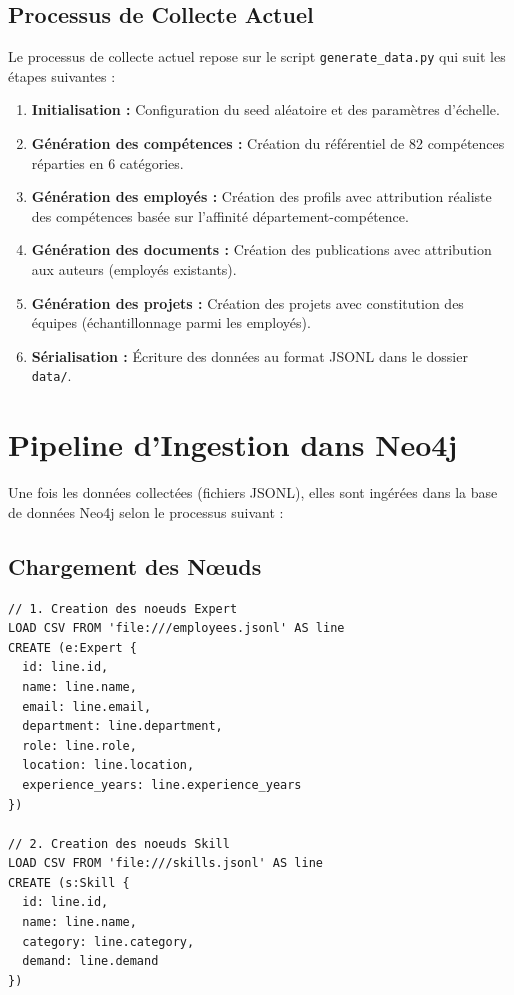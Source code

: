 \documentclass[12pt,a4paper]{article}
\begin{document}
\subsection{Processus de Collecte Actuel}

Le processus de collecte actuel repose sur le script \texttt{generate\_data.py} qui suit les étapes suivantes :

\begin{enumerate}
    \item \textbf{Initialisation :} Configuration du seed aléatoire et des paramètres d'échelle.
    \item \textbf{Génération des compétences :} Création du référentiel de 82 compétences réparties en 6 catégories.
    \item \textbf{Génération des employés :} Création des profils avec attribution réaliste des compétences basée sur l'affinité département-compétence.
    \item \textbf{Génération des documents :} Création des publications avec attribution aux auteurs (employés existants).
    \item \textbf{Génération des projets :} Création des projets avec constitution des équipes (échantillonnage parmi les employés).
    \item \textbf{Sérialisation :} Écriture des données au format JSONL dans le dossier \texttt{data/}.
\end{enumerate}

\section{Pipeline d'Ingestion dans Neo4j}

Une fois les données collectées (fichiers JSONL), elles sont ingérées dans la base de données Neo4j selon le processus suivant :

\subsection{Chargement des Nœuds}

\begin{lstlisting}[language={}]
// 1. Creation des noeuds Expert
LOAD CSV FROM 'file:///employees.jsonl' AS line
CREATE (e:Expert {
  id: line.id,
  name: line.name,
  email: line.email,
  department: line.department,
  role: line.role,
  location: line.location,
  experience_years: line.experience_years
})

// 2. Creation des noeuds Skill
LOAD CSV FROM 'file:///skills.jsonl' AS line
CREATE (s:Skill {
  id: line.id,
  name: line.name,
  category: line.category,
  demand: line.demand
})
\end{lstlisting}
\end{document}
